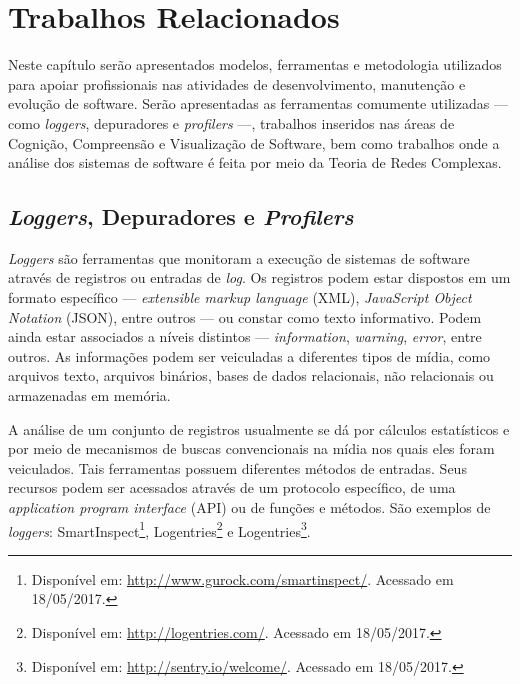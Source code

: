
%

\chapter{Trabalhos Relacionados}
\label{Chapter:RelatedWork}

Neste capítulo serão apresentados modelos, ferramentas e metodologia utilizados
para apoiar profissionais nas atividades de desenvolvimento, manutenção e
evolução de software. Serão apresentadas as ferramentas comumente utilizadas ---
como \textit{loggers}, depuradores e \textit{profilers} ---, trabalhos inseridos
nas áreas de Cognição, Compreensão e Visualização de Software, bem como
trabalhos onde a análise dos sistemas de software é feita por meio da Teoria de
Redes Complexas.

\section{\textit{Loggers}, Depuradores e \textit{Profilers}}
\label{sec:Loggers}

\textit{Loggers} são ferramentas que monitoram a execução de sistemas de
software através de registros ou entradas de \textit{log}.
Os registros podem estar dispostos em um formato específico ---
\textit{extensible markup language} (XML), \textit{JavaScript Object Notation} (JSON),
entre outros --- ou constar como texto informativo.
Podem ainda estar associados a níveis distintos --- \textit{information},
\textit{warning}, \textit{error}, entre outros.
As informações podem ser veiculadas a diferentes tipos de mídia, como arquivos
texto, arquivos binários, bases de dados relacionais, não relacionais ou
armazenadas em memória.

A análise de um conjunto de registros usualmente se dá por cálculos estatísticos
e por meio de mecanismos de buscas convencionais na mídia nos quais eles foram
veiculados.
Tais ferramentas possuem diferentes métodos de entradas. Seus recursos podem ser
acessados através de um protocolo específico, de uma
\textit{application program interface} (API) ou de funções e métodos.
São exemplos de \textit{loggers}:
SmartInspect\footnote{Disponível em: \href{http://www.gurock.com/smartinspect/}{http://www.gurock.com/smartinspect/}. Acessado em 18/05/2017.},
Logentries\footnote{Disponível em: \href{http://logentries.com/}{http://logentries.com/}. Acessado em 18/05/2017.} e
Logentries\footnote{Disponível em: \href{http://sentry.io/welcome/}{http://sentry.io/welcome/}. Acessado em 18/05/2017.}.

